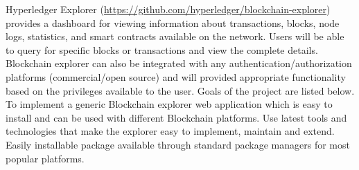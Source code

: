 Hyperledger Explorer (\url{https://github.com/hyperledger/blockchain-explorer}) provides a dashboard for viewing information about transactions, blocks, node logs, statistics,  and smart contracts available on the network. Users will be able to query for specific blocks or transactions and view the complete details. Blockchain explorer can also be integrated with any authentication/authorization platforms (commercial/open source) and will provided appropriate functionality based on the privileges available to the user. 
Goals of the project are listed below.
To implement a generic Blockchain explorer web application which is easy to install and can be used with different Blockchain platforms.
Use latest tools and technologies that make the explorer easy to implement, maintain and extend.
Easily installable package available through standard package managers for most popular platforms.


